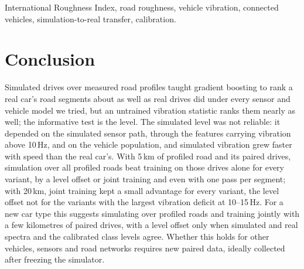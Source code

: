 \documentclass[conference]{IEEEtran}
\begin{document}
\begin{IEEEkeywords}
International Roughness Index, road roughness, vehicle vibration, connected vehicles, simulation-to-real transfer, calibration.
\end{IEEEkeywords}









\section{Conclusion}
\label{sec:conclusion}
Simulated drives over measured road profiles taught gradient boosting to rank a real car's road segments about as well as real drives did under every sensor and vehicle model we tried, but an untrained vibration statistic ranks them nearly as well; the informative test is the level.
The simulated level was not reliable: it depended on the simulated sensor path, through the features carrying vibration above 10\,Hz, and on the vehicle population, and simulated vibration grew faster with speed than the real car's.
With 5\,km of profiled road and its paired drives, simulation over all profiled roads beat training on those drives alone for every variant, by a level offset or joint training and even with one pass per segment; with 20\,km, joint training kept a small advantage for every variant, the level offset not for the variants with the largest vibration deficit at 10--15\,Hz.
For a new car type this suggests simulating over profiled roads and training jointly with a few kilometres of paired drives, with a level offset only when simulated and real spectra and the calibrated class levels agree.
Whether this holds for other vehicles, sensors and road networks requires new paired data, ideally collected after freezing the simulator.


\end{document}

